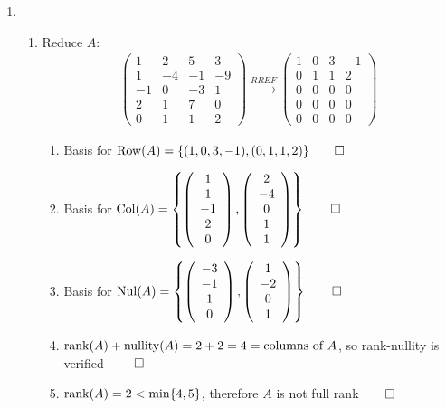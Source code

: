 \documentclass[12pt, a4paper]{article}
\begin{document}
\begin{enumerate}[Q\arabic*.]
    \pagebreak
    \item
      \begin{enumerate}[(\alph*)]
        \item Reduce $A$:
          \begin{align*}
            \left(\begin{array}{cccc} 1 & 2 & 5 & 3\\ 1 & -4 & -1 & -9\\ -1 & 0 & -3 & 1\\ 2 & 1 & 7 & 0\\ 0 & 1 & 1 & 2 \end{array}\right)
            \xrightarrow{RREF}
            \left(\begin{array}{cccc} 1 & 0 & 3 & -1\\ 0 & 1 & 1 & 2\\ 0 & 0 & 0 & 0\\ 0 & 0 & 0 & 0\\ 0 & 0 & 0 & 0 \end{array}\right)
          \end{align*}
          \begin{enumerate}[(\roman*)]
            \item Basis for $\operatorname{Row}(A) = \{(1,0,3,-1),(0,1,1,2)\} \qed$ 
            \item Basis for $\operatorname{Col}(A) = \left\{\left(\begin{array}{c} 1\\ 1\\ -1\\ 2\\ 0 \end{array}\right),\left(\begin{array}{c} 2\\ -4\\ 0\\ 1\\ 1 \end{array}\right)\right\} \qed$ 
            \item Basis for $\operatorname{Nul}(A) = \left\{\left(\begin{array}{c} -3\\-1\\1\\0 \end{array}\right),\left(\begin{array}{c} 1\\-2\\0\\1 \end{array}\right)\right\} \qed$ 
            \item $\operatorname{rank}(A) + \operatorname{nullity}(A) = 2 + 2 = 4 = \text{columns of }A$, so rank-nullity is verified $\qed$
            \item $\operatorname{rank}(A)=2<\text{min}\{4,5\}$, therefore $A$ is not full rank$\qed$
          \end{enumerate}


\end{enumerate}
\end{enumerate}
\end{document}

